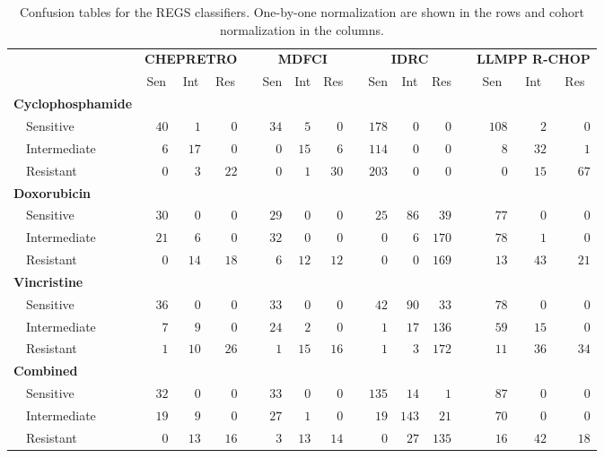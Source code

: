 \begin{table}[!tbp]
\begin{adjustwidth}{-1in}{0in}
{\small
\caption{Confusion tables for the REGS classifiers.
One-by-one normalization are shown in the rows and cohort normalization in the
columns.\label{tab:confusiondrugonebyone}} 
\begin{center}
\begin{tabular}{lrrrcrrrcrrrcrrr}
\hline\hline
\multicolumn{1}{l}{\bfseries }&\multicolumn{3}{c}{\bfseries CHEPRETRO}&\multicolumn{1}{c}{\bfseries }&\multicolumn{3}{c}{\bfseries MDFCI}&\multicolumn{1}{c}{\bfseries }&\multicolumn{3}{c}{\bfseries IDRC}&\multicolumn{1}{c}{\bfseries }&\multicolumn{3}{c}{\bfseries LLMPP R-CHOP}\tabularnewline
\cline{2-4} \cline{6-8} \cline{10-12} \cline{14-16}
\multicolumn{1}{l}{}&\multicolumn{1}{c}{Sen}&\multicolumn{1}{c}{Int}&\multicolumn{1}{c}{Res}&\multicolumn{1}{c}{}&\multicolumn{1}{c}{Sen}&\multicolumn{1}{c}{Int}&\multicolumn{1}{c}{Res}&\multicolumn{1}{c}{}&\multicolumn{1}{c}{Sen}&\multicolumn{1}{c}{Int}&\multicolumn{1}{c}{Res}&\multicolumn{1}{c}{}&\multicolumn{1}{c}{Sen}&\multicolumn{1}{c}{Int}&\multicolumn{1}{c}{Res}\tabularnewline
\hline
{\bfseries Cyclophosphamide}&&&&&&&&&&&&&&&\tabularnewline
~~Sensitive&$40$&$ 1$&$ 0$&&$34$&$ 5$&$ 0$&&$178$&$  0$&$  0$&&$108$&$ 2$&$ 0$\tabularnewline
~~Intermediate&$ 6$&$17$&$ 0$&&$ 0$&$15$&$ 6$&&$114$&$  0$&$  0$&&$  8$&$32$&$ 1$\tabularnewline
~~Resistant&$ 0$&$ 3$&$22$&&$ 0$&$ 1$&$30$&&$203$&$  0$&$  0$&&$  0$&$15$&$67$\tabularnewline
\hline
{\bfseries Doxorubicin}&&&&&&&&&&&&&&&\tabularnewline
~~Sensitive&$30$&$ 0$&$ 0$&&$29$&$ 0$&$ 0$&&$ 25$&$ 86$&$ 39$&&$ 77$&$ 0$&$ 0$\tabularnewline
~~Intermediate&$21$&$ 6$&$ 0$&&$32$&$ 0$&$ 0$&&$  0$&$  6$&$170$&&$ 78$&$ 1$&$ 0$\tabularnewline
~~Resistant&$ 0$&$14$&$18$&&$ 6$&$12$&$12$&&$  0$&$  0$&$169$&&$ 13$&$43$&$21$\tabularnewline
\hline
{\bfseries Vincristine}&&&&&&&&&&&&&&&\tabularnewline
~~Sensitive&$36$&$ 0$&$ 0$&&$33$&$ 0$&$ 0$&&$ 42$&$ 90$&$ 33$&&$ 78$&$ 0$&$ 0$\tabularnewline
~~Intermediate&$ 7$&$ 9$&$ 0$&&$24$&$ 2$&$ 0$&&$  1$&$ 17$&$136$&&$ 59$&$15$&$ 0$\tabularnewline
~~Resistant&$ 1$&$10$&$26$&&$ 1$&$15$&$16$&&$  1$&$  3$&$172$&&$ 11$&$36$&$34$\tabularnewline
\hline
{\bfseries Combined}&&&&&&&&&&&&&&&\tabularnewline
~~Sensitive&$32$&$ 0$&$ 0$&&$33$&$ 0$&$ 0$&&$135$&$ 14$&$  1$&&$ 87$&$ 0$&$ 0$\tabularnewline
~~Intermediate&$19$&$ 9$&$ 0$&&$27$&$ 1$&$ 0$&&$ 19$&$143$&$ 21$&&$ 70$&$ 0$&$ 0$\tabularnewline
~~Resistant&$ 0$&$13$&$16$&&$ 3$&$13$&$14$&&$  0$&$ 27$&$135$&&$ 16$&$42$&$18$\tabularnewline
\hline
\end{tabular}\end{center}}
\end{adjustwidth}
\end{table}
